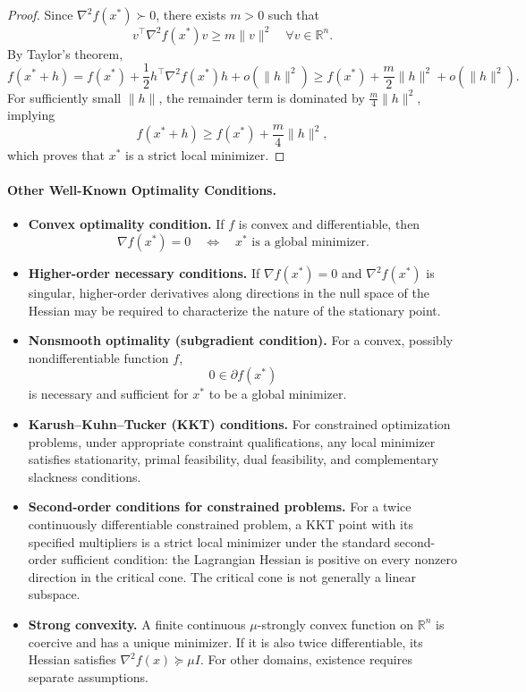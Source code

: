 \documentclass[11pt]{article}
\begin{document}
\begin{proof}
Since \(\nabla^2 f(x^*) \succ 0\), there exists \(m > 0\) such that
\[
v^\top \nabla^2 f(x^*) v \ge m \|v\|^2
\quad \forall v \in \mathbb{R}^n.
\]
By Taylor's theorem,
\[
f(x^* + h)
= f(x^*) + \frac{1}{2} h^\top \nabla^2 f(x^*) h + o(\|h\|^2)
\ge f(x^*) + \frac{m}{2} \|h\|^2 + o(\|h\|^2).
\]
For sufficiently small \(\|h\|\), the remainder term is dominated by
\(\frac{m}{4}\|h\|^2\), implying
\[
f(x^* + h) \ge f(x^*) + \frac{m}{4}\|h\|^2,
\]
which proves that \(x^*\) is a strict local minimizer.
\end{proof}

\paragraph{Other Well-Known Optimality Conditions.}

\begin{itemize}
\item \textbf{Convex optimality condition.}
If \(f\) is convex and differentiable, then
\[
\nabla f(x^*) = 0
\quad \Longleftrightarrow \quad
x^* \text{ is a global minimizer}.
\]

\item \textbf{Higher-order necessary conditions.}
If \(\nabla f(x^*) = 0\) and \(\nabla^2 f(x^*)\) is singular, higher-order derivatives
along directions in the null space of the Hessian may be required to characterize
the nature of the stationary point.

\item \textbf{Nonsmooth optimality (subgradient condition).}
For a convex, possibly nondifferentiable function \(f\),
\[
0 \in \partial f(x^*)
\]
is necessary and sufficient for \(x^*\) to be a global minimizer.

\item \textbf{Karush--Kuhn--Tucker (KKT) conditions.}
For constrained optimization problems, under appropriate constraint qualifications,
any local minimizer satisfies stationarity, primal feasibility, dual feasibility,
and complementary slackness conditions.

\item \textbf{Second-order conditions for constrained problems.}
For a twice continuously differentiable constrained problem, a KKT point with its specified multipliers is a strict local minimizer under the standard second-order sufficient condition: the Lagrangian Hessian is positive on every nonzero direction in the critical cone. The critical cone is not generally a linear subspace.

\item \textbf{Strong convexity.}
A finite continuous $\mu$-strongly convex function on $\mathbb R^n$ is coercive and has a unique minimizer. If it is also twice differentiable, its Hessian satisfies $\nabla^2f(x)\succeq\mu I$. For other domains, existence requires separate assumptions.
\end{itemize}
\end{document}
